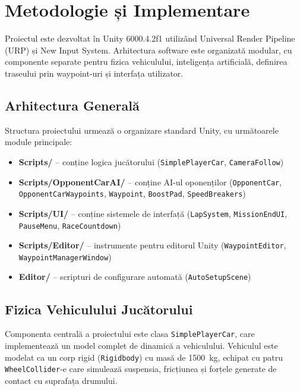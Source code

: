 \section{Metodologie și Implementare}
\label{sec:methodology}

Proiectul este dezvoltat în Unity 6000.4.2f1 utilizând Universal Render Pipeline (URP) și New Input System. Arhitectura software este organizată modular, cu componente separate pentru fizica vehiculului, inteligența artificială, definirea traseului prin waypoint-uri și interfața utilizator.

\subsection{Arhitectura Generală}

Structura proiectului urmează o organizare standard Unity, cu următoarele module principale:

\begin{itemize}
    \item \textbf{Scripts/} -- conține logica jucătorului (\texttt{SimplePlayerCar}, \texttt{CameraFollow})
    \item \textbf{Scripts/OpponentCarAI/} -- conține AI-ul oponenților (\texttt{OpponentCar}, \texttt{OpponentCarWaypoints}, \texttt{Waypoint}, \texttt{BoostPad}, \texttt{SpeedBreakers})
    \item \textbf{Scripts/UI/} -- conține sistemele de interfață (\texttt{LapSystem}, \texttt{MissionEndUI}, \texttt{PauseMenu}, \texttt{RaceCountdown})
    \item \textbf{Scripts/Editor/} -- instrumente pentru editorul Unity (\texttt{WaypointEditor}, \texttt{WaypointManagerWindow})
    \item \textbf{Editor/} -- scripturi de configurare automată (\texttt{AutoSetupScene})
\end{itemize}

\subsection{Fizica Vehiculului Jucătorului}

Componenta centrală a proiectului este clasa \texttt{SimplePlayerCar}, care implementează un model complet de dinamică a vehiculului. Vehiculul este modelat ca un corp rigid (\texttt{Rigidbody}) cu masă de 1500~kg, echipat cu patru \texttt{WheelCollider}-e care simulează suspensia, fricțiunea și forțele generate de contact cu suprafața drumului.

